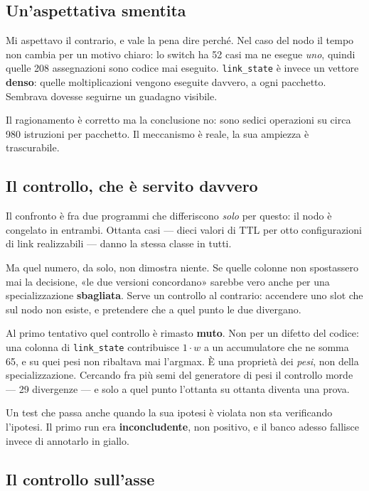 \documentclass[11pt,a4paper,oneside]{report}
\begin{document}
\subsection*{Un'aspettativa smentita}

Mi aspettavo il contrario, e vale la pena dire perché. Nel caso del nodo il
tempo non cambia per un motivo chiaro: lo switch ha 52 casi ma ne esegue
\emph{uno}, quindi quelle 208 assegnazioni sono codice mai eseguito.
\texttt{link\_state} è invece un vettore \textbf{denso}: quelle
moltiplicazioni vengono eseguite davvero, a ogni pacchetto. Sembrava dovesse
seguirne un guadagno visibile.

Il ragionamento è corretto ma la conclusione no: sono sedici operazioni su
circa 980 istruzioni per pacchetto. Il meccanismo è reale, la sua ampiezza è
trascurabile.

\subsection*{Il controllo, che è servito davvero}

Il confronto è fra due programmi che differiscono \emph{solo} per questo: il
nodo è congelato in entrambi. Ottanta casi --- dieci valori di TTL per otto
configurazioni di link realizzabili --- danno la stessa classe in tutti.

Ma quel numero, da solo, non dimostra niente. Se quelle colonne non spostassero
mai la decisione, «le due versioni concordano» sarebbe vero anche per una
specializzazione \textbf{sbagliata}. Serve un controllo al contrario: accendere
uno slot che sul nodo non esiste, e pretendere che a quel punto le due
divergano.

Al primo tentativo quel controllo è rimasto \textbf{muto}. Non per un difetto
del codice: una colonna di \texttt{link\_state} contribuisce $1 \cdot w$ a un
accumulatore che ne somma 65, e su quei pesi non ribaltava mai l'argmax. È una
proprietà dei \emph{pesi}, non della specializzazione. Cercando fra più semi
del generatore di pesi il controllo morde --- 29 divergenze --- e solo a quel
punto l'ottanta su ottanta diventa una prova.

\begin{lezione}
Un test che passa anche quando la sua ipotesi è violata non sta verificando
l'ipotesi. Il primo run era \textbf{inconcludente}, non positivo, e il banco
adesso fallisce invece di annotarlo in giallo.
\end{lezione}

\subsection*{Il controllo sull'asse}
\end{document}
